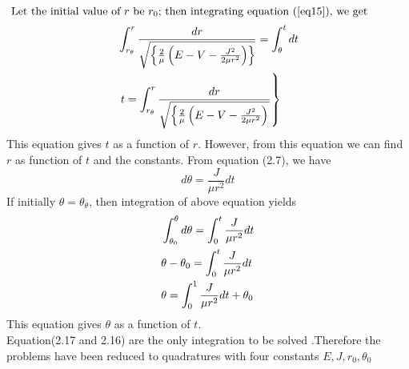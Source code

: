 $\text { Let the initial value of } r \text { be } r_{0} \text {; then integrating equation (\ref{eq15}), we get }$
\begin{align}
	&\int_{r_{\theta}}^{r} \frac{d r}{\sqrt{\left\{\frac{2}{\mu}\left(E-V-\frac{J^{2}}{2 \mu r^{2}}\right)\right\}}}=\int_{\theta}^{t} d t \notag \\
	&\left.t=\int_{r_{\theta}}^{r} \frac{d r}{\sqrt{\left\{\frac{2}{\mu}\left(E-V-\frac{J^{2}}{2 \mu r^{2}}\right)\right.}}\right\} \label{eq16}
\end{align}
This equation gives $t$ as a function of $r$. However, from this equation we can find $r$ as function of $t$ and the constants.
From equation (2.7), we have
$$
d \theta=\frac{J}{\mu r^{2}} d t
$$
If initially $\theta=\theta_{\theta}$, then integration of above equation yields
\begin{align}
&\int_{\theta_{0}}^{\theta} d \theta=\int_{0}^{t} \frac{J}{\mu r^{2}} d t \notag \\
&\theta-\theta_{0}=\int_{0}^{t} \frac{J}{\mu r^{2}} d t \notag \\
&\theta=\int_{0}^{1} \frac{J}{\mu r^{2}} d t+\theta_{0}
\end{align}
This equation gives $\theta$ as a function of $t$.\\
Equation(2.17 and 2.16) are the only integration to be solved .Therefore the problems have been reduced to quadratures with four constants $E,J,r_0,\theta_0$
